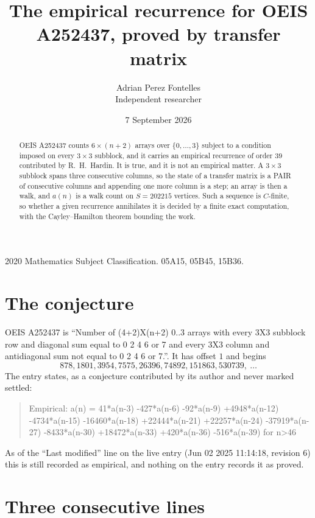 \documentclass[11pt,a4paper]{article}
\title{The empirical recurrence for OEIS A252437, proved by transfer matrix}
\author{Adrian Perez Fontelles\\ \small Independent researcher}
\date{7 September 2026}
\theoremstyle{plain}
\theoremstyle{definition}
\begin{document}
\maketitle

\begin{abstract}
OEIS A252437 counts $6\times(n+2)$ arrays over $\{0,\dots,3\}$ subject to a condition imposed on
every $3\times3$ subblock, and it carries an empirical recurrence of order $39$
contributed by R.~H.~Hardin. It is true, and it is not an empirical matter. A $3\times3$
subblock spans three consecutive columns, so the state of a transfer matrix is a PAIR of
consecutive columns and appending one more column is a step; an array is then a walk, and
$a(n)$ is a walk count on $S=202215$ vertices. Such a sequence is $C$-finite, so whether a given
recurrence annihilates it is decided by a finite exact computation, with the Cayley--Hamilton
theorem bounding the work.
\end{abstract}

\noindent\small 2020 Mathematics Subject Classification. 05A15, 05B45, 15B36.\normalsize

\section{The conjecture}

OEIS A252437 is ``Number of (4+2)X(n+2) 0..3 arrays with every 3X3 subblock row and diagonal sum equal to 0 2 4 6 or 7 and every 3X3 column and antidiagonal sum not equal to 0 2 4 6 or 7.''. It has offset $1$ and begins
\[
878, 1801, 3954, 7575, 26396, 74892, 151863, 530739,\ \dots
\]
The entry states, as a conjecture contributed by its author and never marked settled:
\begin{quote}
Empirical: a(n) = 41*a(n-3) -427*a(n-6) -92*a(n-9) +4948*a(n-12) -4734*a(n-15) -16460*a(n-18) +22444*a(n-21) +22257*a(n-24) -37919*a(n-27) -8433*a(n-30) +18472*a(n-33) +420*a(n-36) -516*a(n-39) for n>46
\end{quote}
As of the ``Last modified'' line on the live entry (Jun 02 2025 11:14:18, revision 6) this is still
recorded as empirical, and nothing on the entry records it as proved.

\section{Three consecutive lines}
\end{document}
